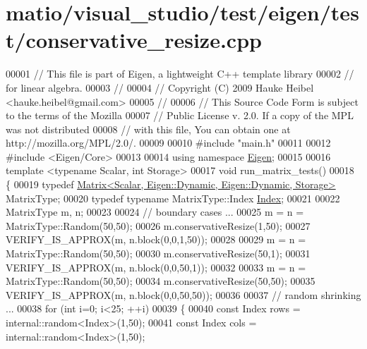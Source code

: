 \hypertarget{matio_2visual__studio_2test_2eigen_2test_2conservative__resize_8cpp_source}{}\section{matio/visual\+\_\+studio/test/eigen/test/conservative\+\_\+resize.cpp}
\label{matio_2visual__studio_2test_2eigen_2test_2conservative__resize_8cpp_source}

\begin{DoxyCode}
00001 \textcolor{comment}{// This file is part of Eigen, a lightweight C++ template library}
00002 \textcolor{comment}{// for linear algebra.}
00003 \textcolor{comment}{//}
00004 \textcolor{comment}{// Copyright (C) 2009 Hauke Heibel <hauke.heibel@gmail.com>}
00005 \textcolor{comment}{//}
00006 \textcolor{comment}{// This Source Code Form is subject to the terms of the Mozilla}
00007 \textcolor{comment}{// Public License v. 2.0. If a copy of the MPL was not distributed}
00008 \textcolor{comment}{// with this file, You can obtain one at http://mozilla.org/MPL/2.0/.}
00009 
00010 \textcolor{preprocessor}{#include "main.h"}
00011 
00012 \textcolor{preprocessor}{#include <Eigen/Core>}
00013 
00014 \textcolor{keyword}{using namespace }\hyperlink{namespace_eigen}{Eigen};
00015 
00016 \textcolor{keyword}{template} <\textcolor{keyword}{typename} Scalar, \textcolor{keywordtype}{int} Storage>
00017 \textcolor{keywordtype}{void} run\_matrix\_tests()
00018 \{
00019   \textcolor{keyword}{typedef} \hyperlink{group___core___module_class_eigen_1_1_matrix}{Matrix<Scalar, Eigen::Dynamic, Eigen::Dynamic, Storage>}
       MatrixType;
00020   \textcolor{keyword}{typedef} \textcolor{keyword}{typename} MatrixType::Index \hyperlink{namespace_eigen_a62e77e0933482dafde8fe197d9a2cfde}{Index};
00021 
00022   MatrixType m, n;
00023 
00024   \textcolor{comment}{// boundary cases ...}
00025   m = n = MatrixType::Random(50,50);
00026   m.conservativeResize(1,50);
00027   VERIFY\_IS\_APPROX(m, n.block(0,0,1,50));
00028 
00029   m = n = MatrixType::Random(50,50);
00030   m.conservativeResize(50,1);
00031   VERIFY\_IS\_APPROX(m, n.block(0,0,50,1));
00032 
00033   m = n = MatrixType::Random(50,50);
00034   m.conservativeResize(50,50);
00035   VERIFY\_IS\_APPROX(m, n.block(0,0,50,50));
00036 
00037   \textcolor{comment}{// random shrinking ...}
00038   \textcolor{keywordflow}{for} (\textcolor{keywordtype}{int} i=0; i<25; ++i)
00039   \{
00040     \textcolor{keyword}{const} Index rows = internal::random<Index>(1,50);
00041     \textcolor{keyword}{const} Index cols = internal::random<Index>(1,50);

\end{DoxyCode}
